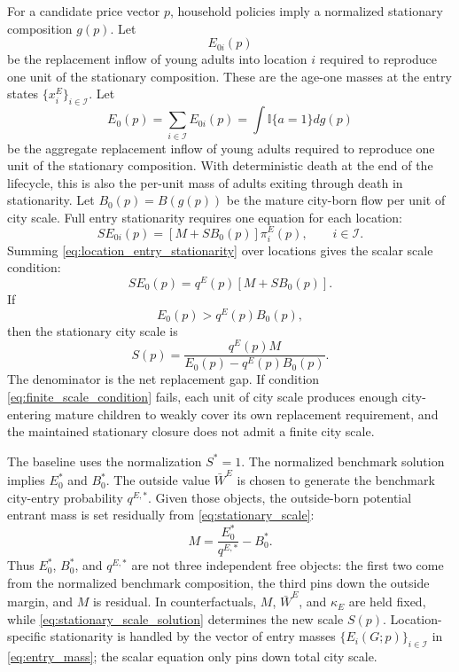 \documentclass[11pt]{article}
\newcommand{\ind}{\mathbb{I}}
\newcommand{\Iset}{\mathcal I}
\begin{document}
For a candidate price vector $p$, household policies imply a normalized stationary composition $g(p)$. Let
\begin{equation*}
    E_{0i}(p)
\end{equation*}
be the replacement inflow of young adults into location $i$ required to reproduce one unit of the stationary composition. These are the age-one masses at the entry states $\{x_i^E\}_{i\in\Iset}$. Let
\begin{equation*}
    E_0(p)=\sum_{i\in\Iset}E_{0i}(p)
    =
    \int \ind\{a=1\}dg(p)
\end{equation*}
be the aggregate replacement inflow of young adults required to reproduce one unit of the stationary composition. With deterministic death at the end of the lifecycle, this is also the per-unit mass of adults exiting through death in stationarity. Let $B_0(p)=B(g(p))$ be the mature city-born flow per unit of city scale. Full entry stationarity requires one equation for each location:
\begin{equation}
    S E_{0i}(p)
    =
    \left[M+S B_0(p)\right]\pi_i^E(p),
    \qquad i\in\Iset.
    \label{eq:location_entry_stationarity}
\end{equation}
Summing \eqref{eq:location_entry_stationarity} over locations gives the scalar scale condition:
\begin{equation}
    S E_0(p)
    =
    q^E(p)\left[M+S B_0(p)\right].
    \label{eq:stationary_scale}
\end{equation}
If
\begin{equation}
    E_0(p)>q^E(p)B_0(p),
    \label{eq:finite_scale_condition}
\end{equation}
then the stationary city scale is
\begin{equation}
    S(p)=\frac{q^E(p)M}{E_0(p)-q^E(p)B_0(p)}.
    \label{eq:stationary_scale_solution}
\end{equation}
The denominator is the net replacement gap. If condition \eqref{eq:finite_scale_condition} fails, each unit of city scale produces enough city-entering mature children to weakly cover its own replacement requirement, and the maintained stationary closure does not admit a finite city scale.

The baseline uses the normalization $S^\ast=1$. The normalized benchmark solution implies $E_0^\ast$ and $B_0^\ast$. The outside value $\bar W^E$ is chosen to generate the benchmark city-entry probability $q^{E,\ast}$. Given those objects, the outside-born potential entrant mass is set residually from \eqref{eq:stationary_scale}:
\begin{equation*}
    M=\frac{E_0^\ast}{q^{E,\ast}}-B_0^\ast.
\end{equation*}
Thus $E_0^\ast$, $B_0^\ast$, and $q^{E,\ast}$ are not three independent free objects: the first two come from the normalized benchmark composition, the third pins down the outside margin, and $M$ is residual. In counterfactuals, $M$, $\bar W^E$, and $\kappa_E$ are held fixed, while \eqref{eq:stationary_scale_solution} determines the new scale $S(p)$. Location-specific stationarity is handled by the vector of entry masses $\{E_i(G;p)\}_{i\in\Iset}$ in \eqref{eq:entry_mass}; the scalar equation only pins down total city scale.
\end{document}
